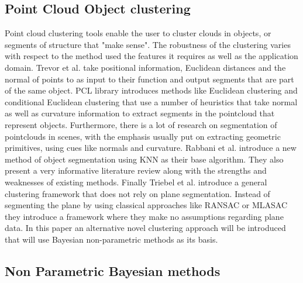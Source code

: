 \documentclass[twoside,hidelinks]{article}
\begin{document}
\subsection{Point Cloud Object clustering}


Point cloud clustering tools enable the user to cluster clouds in objects, or segments of structure that "make sense". The robustness of the clustering varies with respect to the method used the features it requires as well as the application domain.
Trevor et al.\cite{pointSeg} take positional information, Euclidean distances and the normal of points to as input to their function and output segments that are part of the same object. PCL library\cite{pcl} introduces methods like Euclidean clustering and conditional Euclidean clustering that use a number of heuristics that take normal as well as curvature information to extract segments in the pointcloud that represent objects. Furthermore, there is a lot of research on segmentation of pointclouds in scenes, with the emphasis usually put on extracting geometric primitives\cite{planarSeg},\cite{planarSeg2} using cues like normals and curvature. Rabbani et al.\cite{segOverview} introduce a new method of object segmentation using KNN as their base algorithm. They also present a very informative literature review along with the strengths and weaknesses of existing methods. Finally Triebel et al.\cite{smartSeg} introduce a general clustering framework that does not rely on plane segmentation. Instead of segmenting the plane by using classical approaches like RANSAC or MLASAC they introduce a framework where they make no assumptions regarding plane data. 
 In this paper an alternative novel clustering approach will be introduced that will use Bayesian non-parametric methods as its basis.

\subsection{Non Parametric Bayesian methods}
\end{document}
